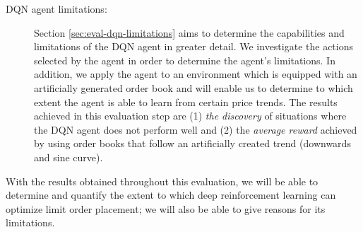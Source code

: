 \begin{description}
    \item[DQN agent limitations: ]
    Section \ref{sec:eval-dqn-limitations} aims to determine the capabilities and limitations of the DQN agent in greater detail.
    We investigate the actions selected by the agent in order to determine the agent's limitations.
    In addition, we apply the agent to an environment which is equipped with an artificially generated order book and will enable us to determine to which extent the agent is able to learn from certain price trends.
    The results achieved in this evaluation step are (1) \textit{the discovery} of situations where the DQN agent does not perform well and (2) the \textit{average reward} achieved by using order books that follow an artificially created trend (downwards and sine curve).
\end{description}
With the results obtained throughout this evaluation, we will be able to determine and quantify the extent to which deep reinforcement learning can optimize limit order placement; we will also be able to give reasons for its limitations.

